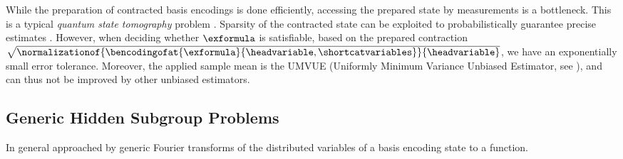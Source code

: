 While the preparation of contracted basis encodings is done efficiently, accessing the prepared state by measurements is a bottleneck.
This is a typical \emph{quantum state tomography} problem \cite{roth_semi-device-dependent_2023}.
Sparsity of the contracted state can be exploited to probabilistically guarantee precise estimates \cite{gross_quantum_2010}.
However, when deciding whether $\exformula$ is satisfiable, based on the prepared contraction $\sqrt{\normalizationof{\bencodingofat{\exformula}{\headvariable,\shortcatvariables}}{\headvariable}}$, we have an exponentially small error tolerance.
Moreover, the applied sample mean is the UMVUE (Uniformly Minimum Variance Unbiased Estimator, see \cite{casella_statistical_2001}), and can thus not be improved by other unbiased estimators.


\subsection{Generic Hidden Subgroup Problems}

In general \cite{nielsen_quantum_2010} approached by generic Fourier transforms of the distributed variables of a basis encoding state to a function.